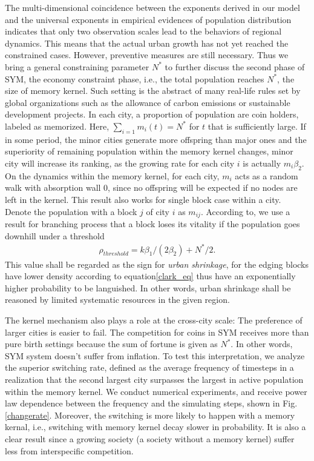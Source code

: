 \documentclass[reprint,unsortedaddress,amsmath,amssymb,aps,prl,showkeys]{revtex4-2}
\begin{document}
The multi-dimensional coincidence between the exponents derived in our model and the universal exponents in empirical evidences of population distribution indicates that only two observation scales lead to the behaviors of regional dynamics. This means that the actual urban growth has not yet reached the constrained cases. However, preventive measures are still necessary. Thus we bring a general constraining parameter $N^*$ to further discuss the second phase of SYM, the economy constraint phase, i.e., the total population reaches $N^*$, the size of memory kernel. Such setting is the abstract of many real-life rules set by global organizations such as the allowance of carbon emissions or sustainable development projects. In each city, a proportion of population are coin holders, labeled as memorized. Here, $\sum_{i=1} m_i(t) = N^*$ for $t$ that is sufficiently large. If in some period, the minor cities generate more offspring than major ones and the superiority of remaining population within the memory kernel changes, minor city will increase its ranking, as the growing rate for each city $i$ is actually $m_i\beta_2$. On the dynamics within the memory kernel, for each city, $m_i$ acts as a random walk with absorption wall $0$, since no offspring will be expected if no nodes are left in the kernel. This result also works for single block case within a city. Denote the population with a block $j$ of city $i$ as $m_{ij}$. According to\@\cite{durrett1999essentials}, we use a result for branching process that a block loses its vitality if the population goes downhill under a threshold \begin{align}\rho_{threshold} = k\beta_1/(2\beta_2)+N^*/2.\end{align} This value shall be regarded as the sign for \emph{urban shrinkage}, for the edging blocks have lower density according to equation\@\ref{clark_eq} thus have an exponentially higher probability to be languished. In other words, urban shrinkage shall be reasoned by limited systematic resources in the given region. 

The kernel mechanism also plays a role at the cross-city scale: The preference of larger cities is easier to fail. The competition for coins in SYM receives more than pure birth settings because the sum of fortune is given as $N^*$. In other words, SYM system doesn't suffer from inflation. To test this interpretation, we analyze the superior switching rate, defined as the average frequency of timesteps in a realization that the second largest city surpasses the largest in active population within the memory kernel. We conduct numerical experiments, and receive power law dependence between the frequency and the simulating steps, shown in Fig.\@\ref{changerate}. Moreover, the switching is more likely to happen with a memory kernal, i.e., switching with memory kernel decay slower in probability. It is also a clear result since a growing society (a society without a memory kernel) suffer less from interspecific competition.
\end{document}
